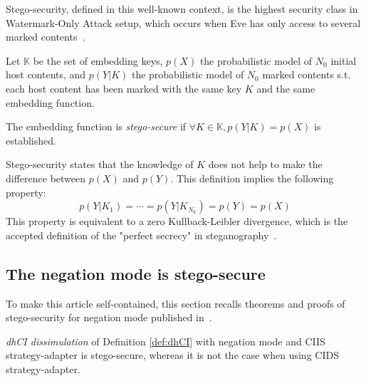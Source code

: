 \documentclass{comjnl}
\begin{document}
Stego-security,  defined in  this well-known  context, is  the  highest security
class in Watermark-Only  Attack setup, which occurs when Eve  has only access to
several marked contents~\cite{Cayre2008}.


Let $\mathds{K}$ be the set of embedding keys, $p(X)$ the probabilistic model of
$N_0$ initial  host contents,  and $p(Y|K)$ the  probabilistic model  of $N_0$
marked contents s.t. each host  content has  been marked
with the same key $K$ and the same embedding function.

\begin{definition}
\label{Def:Stego-security}  The embedding  function  is \emph{stego-secure}
if  $\forall K \in \mathds{K}, p(Y|K)=p(X)$ is established.
\end{definition}







 Stego-security  states that  the knowledge  of  $K$ does  not help  to make  the
 difference  between $p(X)$ and  $p(Y)$.  This  definition implies  the following
 property:
 $$p(Y|K_1)= \cdots = p(Y|K_{N_k})=p(Y)=p(X)$$ 
 This property is equivalent to  a zero Kullback-Leibler divergence, which is the
 accepted definition of the "perfect secrecy" in steganography~\cite{Cachin2004}.


\subsection{The negation mode is stego-secure}
To make this article self-contained, this section recalls theorems and proofs of stego-security for negation mode published in~\cite{gfb10:ip}.

\begin{proposition} \emph{dhCI dissimulation}  of Definition \ref{def:dhCI} with
negation mode and  CIIS strategy-adapter is stego-secure, whereas  it is not the
case when using CIDS strategy-adapter.
\end{proposition}
\end{document}
